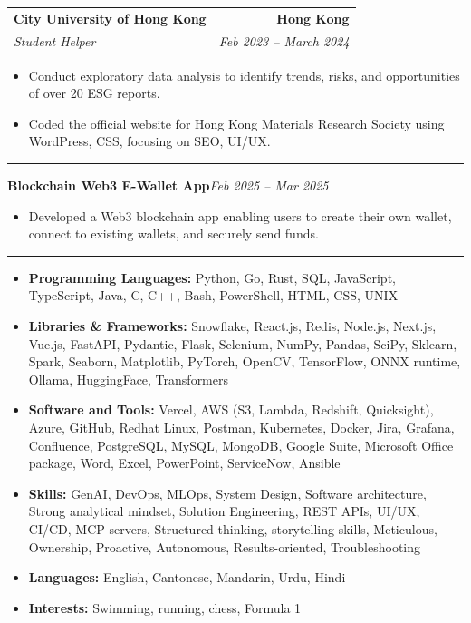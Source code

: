 \documentclass[9pt,a4paper]{article}
\makeatletter
\newcommand{\ressection}[1]{%
  \vspace{0.8em}%
  \noindent{\large\scshape\bfseries #1}\par\nobreak
  \vspace{-\parskip}%
  \noindent\rule{\linewidth}{0.1pt}\par\nobreak
  \vspace{-\parskip}%
}
\newcommand{\resumeSubheading}[4]{%
  \vspace{0.6em}%
  \begin{tabular*}{\textwidth}{l@{\extracolsep{\fill}}r}
    \textbf{#1} & \textbf{#2} \\
    \textit{\small #3} & \textit{\small #4} \\
  \end{tabular*}\vspace{0.32em}}
\newcommand{\resumeHeading}[2]{%
  \vspace{0.6em}%
  \noindent\textbf{\small #1}\hfill\textit{\small #2}\par\vspace{0.28em}}
\makeatother
\begin{document}
\resumeSubheading{City University of Hong Kong}{Hong Kong}{Student Helper}{Feb 2023 -- March 2024}
\begin{itemize}
  \item Conduct exploratory data analysis to identify trends, risks, and opportunities of over 20 ESG reports.
  \item Coded the official website for Hong Kong Materials Research Society using WordPress, CSS, focusing on SEO, UI/UX.
\end{itemize}

\ressection{Projects}

\resumeHeading{Blockchain Web3 E-Wallet App}{Feb 2025 -- Mar 2025}
\begin{itemize}
  \item Developed a Web3 blockchain app enabling users to create their own wallet, connect to existing wallets, and securely send funds.
\end{itemize}

\ressection{Skills and Interests}
\begin{itemize}
  \item \textbf{Programming Languages:} Python, Go, Rust, SQL, JavaScript, TypeScript, Java, C, C++, Bash, PowerShell, HTML, CSS, UNIX
  \item \textbf{Libraries \& Frameworks:} Snowflake, React.js, Redis, Node.js, Next.js, Vue.js, FastAPI, Pydantic, Flask, Selenium, NumPy, Pandas, SciPy, Sklearn, Spark, Seaborn, Matplotlib, PyTorch, OpenCV, TensorFlow, ONNX runtime, Ollama, HuggingFace, Transformers
  \item \textbf{Software and Tools:} Vercel, AWS (S3, Lambda, Redshift, Quicksight), Azure, GitHub, Redhat Linux, Postman, Kubernetes, Docker, Jira, Grafana, Confluence, PostgreSQL, MySQL, MongoDB, Google Suite, Microsoft Office package, Word, Excel, PowerPoint, ServiceNow, Ansible
  \item \textbf{Skills:} GenAI, DevOps, MLOps, System Design, Software architecture, Strong analytical mindset, Solution Engineering, REST APIs, UI/UX, CI/CD, MCP servers, Structured thinking, storytelling skills, Meticulous, Ownership, Proactive, Autonomous, Results-oriented, Troubleshooting
  \item \textbf{Languages:} English, Cantonese, Mandarin, Urdu, Hindi
  \item \textbf{Interests:} Swimming, running, chess, Formula 1
\end{itemize}
\end{document}
